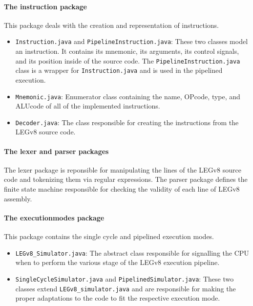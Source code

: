 \paragraph*{The instruction package}

This package deals with the creation and representation of instructions.

\begin{itemize}
	\item \verb|Instruction.java| and \verb|PipelineInstruction.java|: \newline These two classes model an instruction. It contains its mnemonic, its arguments, its control signals, and its position inside of the source code. The \verb|PipelineInstruction.java| class is a wrapper for \verb|Instruction.java| and is used in the pipelined execution.
	\item \verb|Mnemonic.java|: \newline Enumerator class containing the name, OPcode, type, and ALUcode of all of the implemented instructions.
	\item \verb|Decoder.java|: \newline The class responsible for creating the instructions from the LEGv8 source code.
\end{itemize}


\paragraph*{The lexer and parser packages}

The lexer package is reponsible for manipulating the lines of the LEGv8 source code and tokenizing them via regular expressions. The parser package defines the finite state machine responsible for checking the validity of each line of LEGv8 assembly.

\paragraph*{The executionmodes package}

This package contains the single cycle and pipelined execution modes.

\begin{itemize}
	\item \verb|LEGv8_Simulator.java|: \newline The abstract class responsible for signalling the CPU when to perform the various stage of the LEGv8 execution pipeline.
	\item \verb|SingleCycleSimulator.java| and \verb|PipelinedSimulator.java|: \newline These two classes extend \verb|LEGv8_simulator.java| and are responsible for making the proper adaptations to the code to fit the respective execution mode.
\end{itemize}
